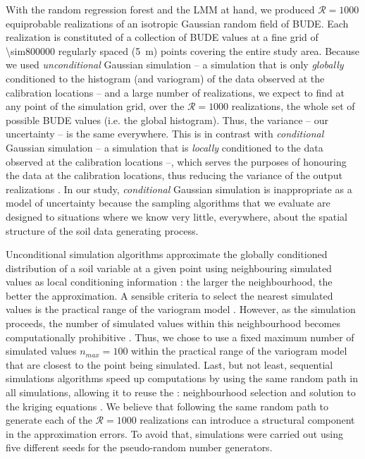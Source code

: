 With the random regression forest and the LMM at hand, we produced $\mathcal{R} = 1000$ equiprobable 
realizations of an isotropic Gaussian random field of BUDE. Each realization is constituted of a collection of 
BUDE values at a fine grid of \num{\sim800000} regularly spaced (\SI{5}{\metre}) points covering the entire 
study area. Because we used \emph{unconditional} Gaussian simulation -- a simulation that is only 
\emph{globally} conditioned to the histogram (and variogram) of the data observed at the calibration locations 
\cite{Goovaerts1997} -- and a large number of realizations, we expect to find at any point of the simulation 
grid, over the $\mathcal{R} = 1000$ realizations, the whole set of possible BUDE values (i.e. the global 
histogram). Thus, the variance -- our uncertainty -- is the same everywhere. This is in contrast with 
\emph{conditional} Gaussian simulation -- a simulation that is \emph{locally} conditioned to the data observed 
at the calibration locations --, which serves the purposes of honouring the data at the calibration locations, 
thus reducing the variance of the output realizations \cite{Goovaerts1997}. In our study, \emph{conditional} 
Gaussian simulation is inappropriate as a model of uncertainty because the sampling algorithms that we evaluate 
are designed to situations where we know very little, everywhere, about the spatial structure of the soil data 
generating process.

Unconditional simulation algorithms approximate the globally conditioned distribution of a soil variable at a 
given point using neighbouring simulated values as local conditioning information \cite{Goovaerts1997}: the 
larger the neighbourhood, the better the approximation. A sensible criteria to select the nearest simulated 
values is the practical range of the variogram model \cite{Pebesma2004}. However, as the simulation proceeds, 
the number of simulated values within this neighbourhood becomes computationally prohibitive 
\cite{WebsterEtAl2007}. Thus, we chose to use a fixed maximum number of simulated values $n_{max} = 100$ 
within the practical range of the variogram model that are closest to the point being simulated. Last, but not 
least, sequential simulations algorithms speed up computations by using the same random path in all 
simulations, allowing it to reuse the : neighbourhood selection and solution to the 
kriging equations \cite{Pebesma2004}. We believe that following the same random path to generate each of the 
$\mathcal{R} = 1000$ realizations can introduce a structural component in the approximation errors. To avoid 
that, simulations were carried out using five different seeds for the pseudo-random number generators.

